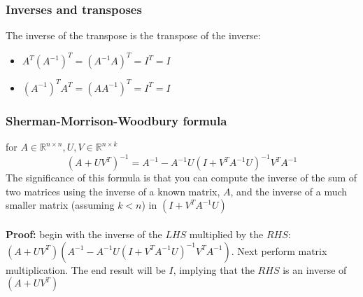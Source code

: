\documentclass{article}
\begin{document}
\subsubsection{Inverses and transposes}
The inverse of the transpose is the transpose of the inverse:
\begin{itemize}
    \item $A^T(A^{-1})^T = (A^{-1}A)^T = I^T = I$
    \item $(A^{-1})^TA^T = (AA^{-1})^T = I^T = I$
\end{itemize}
\subsubsection{Sherman-Morrison-Woodbury formula} 
for $A\in \mathbb{R}^{n\times n}, U,V \in \mathbb{R}^{n\times k}$
\begin{equation*}
    (A+UV^T)^{-1} = A^{-1} - A^{-1}U(I+V^TA^{-1}U)^{-1}V^TA^{-1} 
\end{equation*}
The significance of this formula is that you can compute the inverse of the sum of two matrices using the inverse of a known matrix, $A$, and the inverse of a much smaller matrix (assuming $k<n$) in $(I + V^TA^{-1}U)$\\ \\
\textbf{Proof:} begin with the inverse of the $LHS$ multiplied by the $RHS$: $(A+UV^T) (A^{-1} - A^{-1}U(I+V^TA^{-1}U)^{-1}V^TA^{-1})$. Next perform matrix multiplication. The end result will be $I$, implying that the $RHS$ is an inverse of $(A+UV^T)$
\end{document}
